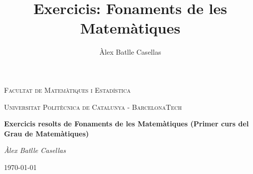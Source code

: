 \documentclass[11pt]{article}
\title{Exercicis: Fonaments de les Matemàtiques}
\author{Àlex Batlle Casellas}
\begin{document}
\begin{titlepage}
	\centering
	{\scshape\LARGE Facultat de Matemàtiques i Estadística \par}
	\vspace{1cm}
	{\scshape\Large Universitat Politècnica de Catalunya - BarcelonaTech\par}
	\vspace{1.5cm}
	{\huge\bfseries Exercicis resolts de Fonaments de les Matemàtiques (Primer curs del Grau de Matemàtiques)
	\par}
	\vspace{2cm}
	{\Large\itshape Àlex Batlle Casellas\par}

	\vfill

	{\large \today\par}
\end{titlepage}


\vfill
\newpage

\tableofcontents
\newpage
\section{}

\newpage
\end{document}
